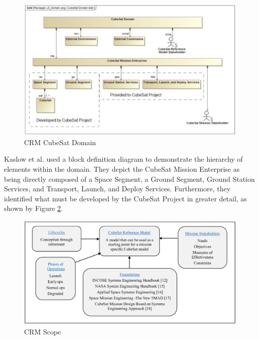 \begin{figure}
    \centering
    \includegraphics[width=\textwidth]{Thesis/Literature_Review/Lit Review Figures/CubeSat Domain.png}
    \caption{CRM CubeSat Domain}
    \label{fig:CRM Domain}
\end{figure}

Kaslow et al. used a block definition diagram to demonstrate the hierarchy of elements within the domain. They depict the CubeSat Mission Enterprise as being directly composed of a Space Segment, a Ground Segment, Ground Station Services, and Transport, Launch, and Deploy Services. Furthermore, they identified what must be developed by the CubeSat Project in greater detail, as shown by Figure \ref{fig:CRM RA Scope}.


\begin{figure}
    \centering
    \includegraphics[width=\textwidth]{Thesis/Literature_Review/Lit Review Figures/CubeSat RA scope.png}
    \caption{CRM Scope}
    \label{fig:CRM RA Scope}
\end{figure}


